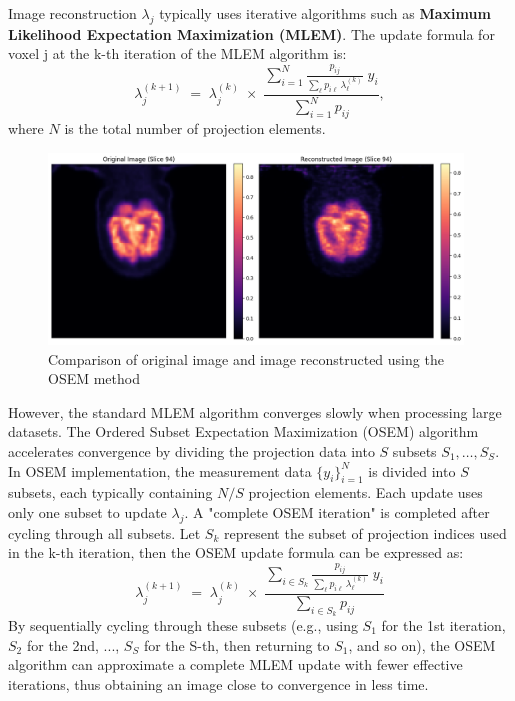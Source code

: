 \documentclass[
reprint,
superscriptaddress,
nofootinbib,
amsmath,amssymb,
aps,
prd,
]{revtex4-2}
\begin{document}
Image reconstruction $\lambda_j$ typically uses iterative algorithms such as \textbf{Maximum Likelihood Expectation Maximization (MLEM)}. The update formula for voxel j at the k-th iteration of the MLEM algorithm is:
\begin{equation}
    \lambda_j^{(k+1)}
    \;=\;
    \lambda_j^{(k)}
    \;\times\;
    \frac{\displaystyle \sum_{i=1}^{N} \frac{p_{ij}}{\sum_{\ell} p_{i\ell}\,\lambda_{\ell}^{(k)}} \; y_i}
    {\displaystyle \sum_{i=1}^{N} p_{ij}}  ,
\end{equation}
where $N$ is the total number of projection elements.

\begin{figure}[htbp]
    \centering
    \vspace{-0.2cm}
    \includegraphics[width=0.98\textwidth]{Images/output}
    \vspace{-0.2cm}
    \caption{Comparison of original image and image reconstructed using the OSEM method}
    \vspace{-0.2cm}
    \label{fig:pet_reconstruction}
\end{figure}

However, the standard MLEM algorithm converges slowly when processing large datasets. The Ordered Subset Expectation Maximization (OSEM) algorithm accelerates convergence by dividing the projection data into $S$ subsets $S_1,\dots,S_S$. In OSEM implementation, the measurement data $\{y_i\}_{i=1}^N$ is divided into $S$ subsets, each typically containing $N/S$ projection elements. Each update uses only one subset to update $\lambda_j$. A "complete OSEM iteration" is completed after cycling through all subsets.
Let $S_k$ represent the subset of projection indices used in the k-th iteration, then the OSEM update formula can be expressed as:
\begin{equation}
    \lambda_j^{(k+1)}
\;=\;
\lambda_j^{(k)}
\;\times\;
\frac{\displaystyle \sum_{i \in S_{k}} \frac{p_{ij}}{\sum_{\ell} p_{i\ell}\,\lambda_{\ell}^{(k)}} \; y_i}
{\displaystyle \sum_{i \in S_{k}} p_{ij}}
\end{equation}
By sequentially cycling through these subsets (e.g., using $S_1$ for the 1st iteration, $S_2$ for the 2nd, ..., $S_S$ for the S-th, then returning to $S_1$, and so on), the OSEM algorithm can approximate a complete MLEM update with fewer effective iterations, thus obtaining an image close to convergence in less time.
\end{document}
